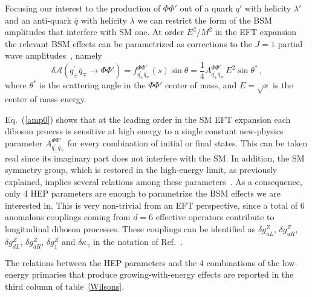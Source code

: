 \documentclass[../report.tex]{subfiles}
\begin{document}
Focusing our interest to the production of $\Phi\Phi'$ out of a quark $q'$ with helicity $\lambda'$ and an anti-quark ${\overline{q}}$ with helicity $\lambda$ we can restrict the form of the BSM amplitudes that interfere with SM one.
At order  $E^2/M^2$ in the EFT expansion the relevant BSM effects can be parametrized as corrections to the $J=1$ partial wave amplitudes~\cite{Franceschini:2017ab}, namely
\begin{equation}\label{amp0}
\delta{\mathcal{A}}\left(q^\prime_{\pm}{\overline{q}}_{\mp}\rightarrow\Phi\Phi'\right)= f^{\Phi\Phi'}_{q^\prime_{\pm}{\overline{q}}_{\mp}}(s)\sin\theta=  \frac{1}{4} A^{\Phi\Phi'}_{q^\prime_{\pm}{\overline{q}}_{\mp}}\, E^2 \sin\theta^*\,,
\end{equation}
where $\theta^*$ is the scattering angle in the $\Phi\Phi'$ center of mass, and $E=\sqrt{s}$ is the center of mass energy.

Eq.~(\ref{amp0}) shows that at the leading order in the SM EFT expansion each diboson process is sensitive at high energy to a single constant new-physics parameter $A^{\Phi\Phi'}_{q^\prime_{\pm}{\overline{q}}_{\mp}}$ for every combination of initial or final states. This can be taken real since its imaginary part does not interfere with the SM. In addition, the SM symmetry group, which is restored in the high-energy limit, as previously explained, implies  several relations among these parameters~\cite{Franceschini:2017ab}. %
As a consequence, only $4$ HEP parameters are enough to parametrize the BSM effects we are interested in. This is very non-trivial from an EFT perspective, since a total of $6$ anomalous couplings coming from $d=6$ effective operators contribute to longitudinal diboson processes. These couplings can be identified as
${\delta g^Z_{uL}}$, ${\delta g^Z_{uR}}$, ${\delta g^Z_{dL}}$, ${\delta g^Z_{dR}}$, ${\delta g_1^Z}$ and ${\delta \kappa_{\gamma}}$ in the notation of Ref.~\cite{Gupta:2014rxa}.


The relations between the HEP parameters and the $4$ combinations of the low-energy primaries that produce growing-with-energy effects are reported in the third column of table~\ref{Wilsons}.
\end{document}
